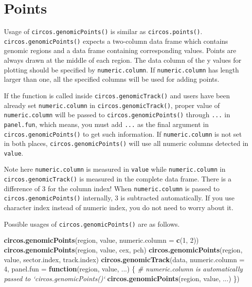 \documentclass[]{book}
\newenvironment{Shaded}{\begin{snugshade}}{\end{snugshade}}
\newcommand{\KeywordTok}[1]{\textcolor[rgb]{0.13,0.29,0.53}{\textbf{#1}}}
\newcommand{\DataTypeTok}[1]{\textcolor[rgb]{0.13,0.29,0.53}{#1}}
\newcommand{\DecValTok}[1]{\textcolor[rgb]{0.00,0.00,0.81}{#1}}
\newcommand{\CommentTok}[1]{\textcolor[rgb]{0.56,0.35,0.01}{\textit{#1}}}
\newcommand{\ControlFlowTok}[1]{\textcolor[rgb]{0.13,0.29,0.53}{\textbf{#1}}}
\newcommand{\NormalTok}[1]{#1}
\theoremstyle{definition}
\theoremstyle{definition}
\theoremstyle{remark}
\begin{document}
\section{Points}\label{genomic-points}

Usage of \texttt{circos.genomicPoints()} is similar as
\texttt{circos.points()}. \texttt{circos.genomicPoints()} expects a
two-column data frame which contains genomic regions and a data frame
containing corresponding values. Points are always drawn at the middle
of each region. The data column of the y values for plotting should be
specified by \texttt{numeric.column}. If \texttt{numeric.column} has
length larger than one, all the specified columns will be used for
adding points.

If the function is called inside \texttt{circos.genomicTrack()} and
users have been already set \texttt{numeric.column} in
\texttt{circos.genomicTrack()}, proper value of \texttt{numeric.column}
will be passed to \texttt{circos.genomicPoints()} through \texttt{...}
in \texttt{panel.fun}, which means, you must add \texttt{...} as the
final argument in \texttt{circos.genomicPoints()} to get such
information. If \texttt{numeric.column} is not set in both places,
\texttt{circos.genomicPoints()} will use all numeric columns detected in
\texttt{value}.

Note here \texttt{numeric.column} is measured in \texttt{value} while
\texttt{numeric.column} in \texttt{circos.genomicTrack()} is measured in
the complete data frame. There is a difference of 3 for the column
index! When \texttt{numeric.column} is passed to
\texttt{circos.genomicPoints()} internally, 3 is subtracted
automatically. If you use character index instead of numeric index, you
do not need to worry about it.

Possible usages of \texttt{circos.genomicPoints()} are as follows.

\begin{Shaded}
\begin{Highlighting}[]
\KeywordTok{circos.genomicPoints}\NormalTok{(region, value, }\DataTypeTok{numeric.column =} \KeywordTok{c}\NormalTok{(}\DecValTok{1}\NormalTok{, }\DecValTok{2}\NormalTok{))}
\KeywordTok{circos.genomicPoints}\NormalTok{(region, value, cex, pch)}
\KeywordTok{circos.genomicPoints}\NormalTok{(region, value, sector.index, track.index)}
\KeywordTok{circos.genomicTrack}\NormalTok{(data, }\DataTypeTok{numeric.column =} \DecValTok{4}\NormalTok{, }
    \DataTypeTok{panel.fun =} \ControlFlowTok{function}\NormalTok{(region, value, ...) \{}
        \CommentTok{# numeric.column is automatically passed to `circos.genomicPoints()`}
        \KeywordTok{circos.genomicPoints}\NormalTok{(region, value, ...)}
\NormalTok{\})}
\end{Highlighting}
\end{Shaded}
\end{document}

